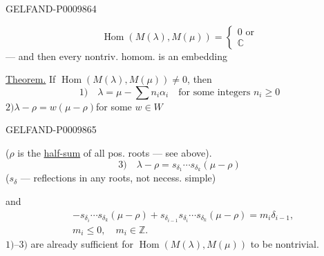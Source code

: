 \begin{GelfandAdjacentEvidence}{GELFAND-P000986}{4}


\[
\operatorname{Hom}(M(\lambda),M(\mu))=
\begin{cases}0\text{ or}\\\mathbb C\end{cases}
\]
--- and then every nontriv. homom. is an embedding

\underline{Theorem.} If $\operatorname{Hom}(M(\lambda),M(\mu))\ne0$, then
\[
1)\quad\lambda=\mu-\sum n_i\alpha_i
\quad\text{for some integers $n_i\ge0$}
\]
$2)$\quad $\lambda-\rho=w(\mu-\rho)$\quad for some $w\in W$

\end{GelfandAdjacentEvidence}
\begin{GelfandAdjacentEvidence}{GELFAND-P000986}{5}


($\rho$ is the \underline{half-sum} of all pos. roots --- see above).
\[
3)\quad\lambda-\rho=s_{\delta_1}\cdots s_{\delta_k}(\mu-\rho)
\]
($s_\delta$ --- reflections in any roots, not necess. simple)

and
\[
\begin{aligned}
&-s_{\delta_i}\cdots s_{\delta_k}(\mu-\rho)
+s_{\delta_{i-1}}s_{\delta_i}\cdots s_{\delta_k}(\mu-\rho)
=m_i\delta_{i-1},\\
&m_i\le0,\quad m_i\in\mathbb Z.
\end{aligned}
\]
$1)$–$3)$ are already sufficient for $\operatorname{Hom}(M(\lambda),M(\mu))$ to be nontrivial.

\end{GelfandAdjacentEvidence}



